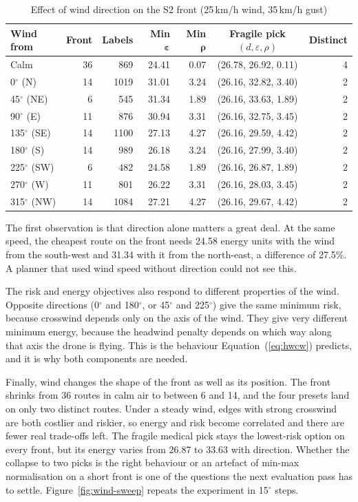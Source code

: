 \documentclass{ssnreview}
\begin{document}
\begin{table}[H]
\centering\caption{Effect of wind direction on the S2 front (25\,km/h wind, 35\,km/h gust)}\label{tab:wind}\footnotesize\setlength{\tabcolsep}{4pt}
\begin{tabular}{l r r r r c r}
\toprule
\textbf{Wind from} & \textbf{Front} & \textbf{Labels} & \textbf{Min $\boldsymbol{\varepsilon}$} & \textbf{Min $\boldsymbol{\rho}$} & \textbf{Fragile pick $(d, \varepsilon, \rho)$} & \textbf{Distinct}\\
\midrule
Calm          & 36 & 869  & 24.41 & 0.07 & (26.78, 26.92, 0.11) & 4\\
0$^\circ$ (N)   & 14 & 1019 & 31.01 & 3.24 & (26.16, 32.82, 3.40) & 2\\
45$^\circ$ (NE) & 6  & 545  & 31.34 & 1.89 & (26.16, 33.63, 1.89) & 2\\
90$^\circ$ (E)  & 11 & 876  & 30.94 & 3.31 & (26.16, 32.75, 3.45) & 2\\
135$^\circ$ (SE)& 14 & 1100 & 27.13 & 4.27 & (26.16, 29.59, 4.42) & 2\\
180$^\circ$ (S) & 14 & 989  & 26.18 & 3.24 & (26.16, 27.99, 3.40) & 2\\
225$^\circ$ (SW)& 6  & 482  & 24.58 & 1.89 & (26.16, 26.87, 1.89) & 2\\
270$^\circ$ (W) & 11 & 801  & 26.22 & 3.31 & (26.16, 28.03, 3.45) & 2\\
315$^\circ$ (NW)& 14 & 1084 & 27.21 & 4.27 & (26.16, 29.67, 4.42) & 2\\
\bottomrule
\end{tabular}
\end{table}

The first observation is that direction alone matters a great deal. At the same speed,
the cheapest route on the front needs 24.58 energy units with the wind from the south-west
and 31.34 with it from the north-east, a difference of 27.5\%. A planner that used wind
speed without direction could not see this.

The risk and energy objectives also respond to different properties of the wind.
Opposite directions (0$^\circ$ and 180$^\circ$, or 45$^\circ$ and 225$^\circ$) give the
same minimum risk, because crosswind depends only on the axis of the wind. They give very
different minimum energy, because the headwind penalty depends on which way along that
axis the drone is flying. This is the behaviour Equation~(\ref{eq:hwcw}) predicts, and it
is why both components are needed.

Finally, wind changes the shape of the front as well as its position. The front shrinks from
36 routes in calm air to between 6 and 14, and the four presets land on only two
distinct routes. Under a steady wind, edges with strong crosswind are both costlier and
riskier, so energy and risk become correlated and there are fewer real trade-offs left.
The fragile medical pick stays the lowest-risk option on every front, but its energy
varies from 26.87 to 33.63 with direction. Whether the collapse to two picks is the right
behaviour or an artefact of min-max normalisation on a short front is one of the questions
the next evaluation pass has to settle. Figure~\ref{fig:wind-sweep} repeats the experiment
in 15$^\circ$ steps.
\end{document}
